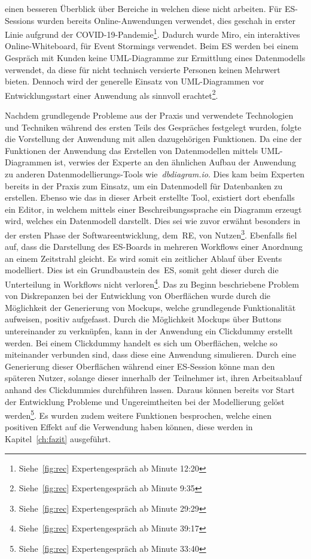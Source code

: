 einen besseren Überblick über Bereiche in welchen diese nicht arbeiten.\newline
Für \ac{ES}-Sessions wurden bereits Online-Anwendungen verwendet, dies geschah in erster Linie aufgrund der COVID-19-Pandemie\footnote{Siehe~\ref{fig:rec} Expertengespräch ab Minute  12:20}.
Dadurch wurde Miro, ein interaktives Online-Whiteboard, für Event Stormings verwendet.\newline
Beim \ac{ES} werden bei einem Gespräch mit Kunden keine UML-Diagramme zur Ermittlung eines Datenmodells verwendet,
da diese für nicht technisch versierte Personen keinen Mehrwert bieten.
Dennoch wird der generelle Einsatz von UML-Diagrammen vor Entwicklungsstart einer Anwendung als sinnvoll erachtet\footnote{Siehe~\ref{fig:rec} Expertengespräch ab Minute  9:35}.

Nachdem grundlegende Probleme aus der Praxis und verwendete Technologien und Techniken während des ersten Teils des Gespräches festgelegt wurden,
folgte die Vorstellung der Anwendung mit allen dazugehörigen Funktionen.
Da eine der Funktionen der Anwendung das Erstellen von Datenmodellen mittels UML-Diagrammen ist, verwies der Experte an den ähnlichen Aufbau der Anwendung
zu anderen Datenmodellierungs-Tools wie~\textit{dbdiagram.io}.
Dies kam beim Experten bereits in der Praxis zum Einsatz, um ein Datenmodell für Datenbanken zu erstellen.
Ebenso wie das in dieser Arbeit erstellte Tool, existiert dort ebenfalls ein Editor, in welchem mittels einer Beschreibungssprache ein Diagramm erzeugt wird,
welches ein Datenmodell darstellt.
Dies sei wie zuvor erwähnt besonders in der ersten Phase der Softwareentwicklung, dem~\ac{RE}, von Nutzen\footnote{Siehe~\ref{fig:rec} Expertengespräch ab Minute  29:29}.\newline
Ebenfalls fiel auf, dass die Darstellung des \ac{ES}-Boards in mehreren Workflows einer Anordnung an einem Zeitstrahl gleicht.
Es wird somit ein zeitlicher Ablauf über Events modelliert.
Dies ist ein Grundbaustein des~\ac{ES}, somit geht dieser durch die Unterteilung in Workflows nicht verloren\footnote{Siehe~\ref{fig:rec} Expertengespräch ab Minute  39:17}.\newline
Das zu Beginn beschriebene Problem von Diskrepanzen bei der Entwicklung von Oberflächen wurde durch die Möglichkeit der Generierung von
Mockups, welche grundlegende Funktionalität aufweisen, positiv aufgefasst.
Durch die Möglichkeit Mockups über Buttons untereinander zu verknüpfen, kann in der Anwendung ein Clickdummy erstellt werden.
Bei einem Clickdummy handelt es sich um Oberflächen, welche so miteinander verbunden sind, dass diese eine Anwendung simulieren.
Durch eine Generierung dieser Oberflächen während einer \ac{ES}-Session könne man den späteren Nutzer, solange dieser innerhalb der Teilnehmer ist,
ihren Arbeitsablauf anhand des Clickdummies durchführen lassen.
Daraus können bereits vor Start der Entwicklung Probleme und Ungereimtheiten bei der Modellierung gelöst werden\footnote{Siehe~\ref{fig:rec} Expertengespräch ab Minute  33:40}.\newline
Es wurden zudem weitere Funktionen besprochen, welche einen positiven Effekt auf die Verwendung haben können, diese werden in Kapitel~\ref{ch:fazit} ausgeführt.
